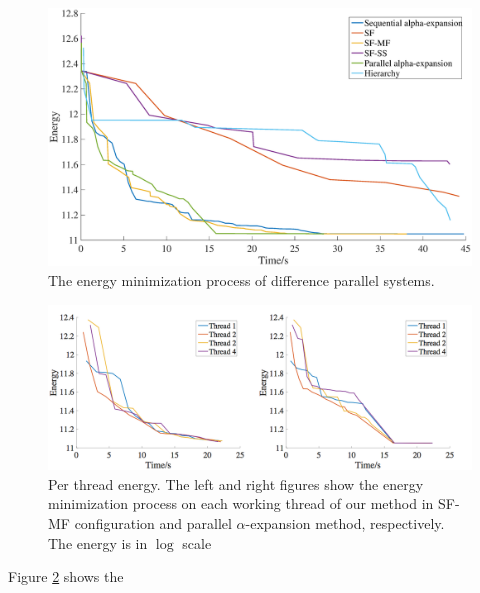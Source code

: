 \begin{figure}[tb]
  \includegraphics[width=\columnwidth]{figure/stereo_global.eps}
  \caption{The energy minimization process of difference parallel systems.}
  \label{fig:stereo_global}
\end{figure}

\begin{figure}[tb]
  \includegraphics[width=\columnwidth]{figure/stereo_threads.png}
  \caption{Per thread energy. The left and right figures show the energy minimization process on each working thread of our method in SF-MF configuration and parallel $\alpha$-expansion method, respectively. The energy is in $\log$ scale}
  \label{fig:stereo_global}
\end{figure}


Figure \ref{fig:stereo_global} shows the

\hang{}

